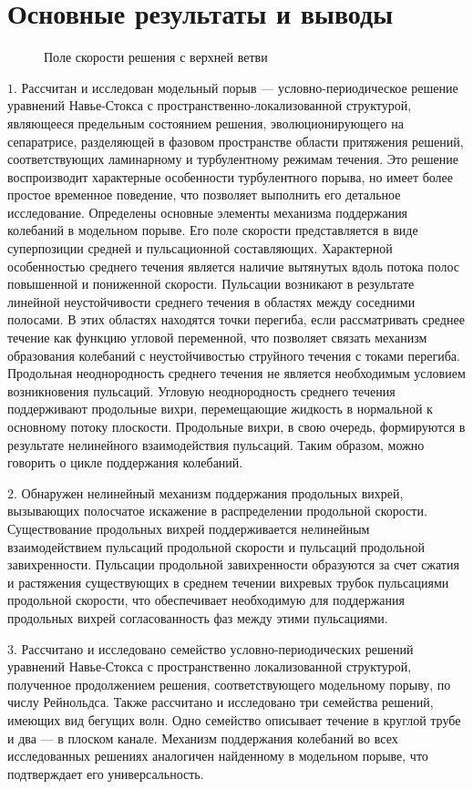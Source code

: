 
\section*{\centering Основные результаты и выводы}


\begin{figure}
\caption{Поле скорости решения с верхней ветви}
\label{ub_cs_pic}
\end{figure}

\noindent $1.$ Рассчитан и исследован модельный порыв --- условно-периодическое решение уравнений Навье-Стокса с пространственно-локализованной структурой, являющееся предельным состоянием решения, эволюционирующего на сепаратрисе, разделяющей в фазовом пространстве области притяжения решений, соответствующих ламинарному и турбулентному режимам течения. Это решение воспроизводит характерные особенности турбулентного порыва, но имеет более простое временное поведение, что позволяет выполнить его детальное исследование. Определены основные элементы механизма поддержания колебаний в модельном порыве. Его поле скорости представляется в виде суперпозиции средней и пульсационной составляющих. Характерной особенностью среднего течения является наличие вытянутых вдоль потока полос повышенной и пониженной скорости. Пульсации возникают в результате линейной неустойчивости среднего течения в областях между соседними полосами. В этих областях находятся точки перегиба, если рассматривать среднее течение как функцию угловой переменной, что позволяет связать механизм образования колебаний с неустойчивостью струйного течения с токами перегиба. Продольная неоднородность среднего течения не является необходимым условием возникновения пульсаций. Угловую неоднородность среднего течения поддерживают продольные вихри, перемещающие жидкость в нормальной к основному потоку плоскости. Продольные вихри, в свою очередь, формируются в результате нелинейного взаимодействия пульсаций. Таким образом, можно говорить о цикле поддержания колебаний. 

\noindent $2.$ Обнаружен нелинейный механизм поддержания продольных вихрей, вызывающих полосчатое искажение в распределении продольной скорости. Существование продольных вихрей поддерживается нелинейным взаимодействием пульсаций продольной скорости и пульсаций продольной завихренности. Пульсации продольной завихренности образуются за счет сжатия и растяжения существующих в среднем течении вихревых трубок пульсациями продольной скорости, что обеспечивает необходимую для поддержания продольных вихрей согласованность фаз между этими пульсациями. 

\noindent $3.$ Рассчитано и исследовано семейство условно-периодических решений уравнений Навье-Стокса с пространственно локализованной структурой, полученное продолжением решения, соответствующего модельному порыву, по числу Рейнольдса. Также рассчитано и исследовано три семейства решений, имеющих вид бегущих волн. Одно семейство описывает течение в круглой трубе и два --- в плоском канале. Механизм поддержания колебаний во всех исследованных решениях аналогичен найденному в модельном порыве, что подтверждает его универсальность. 
